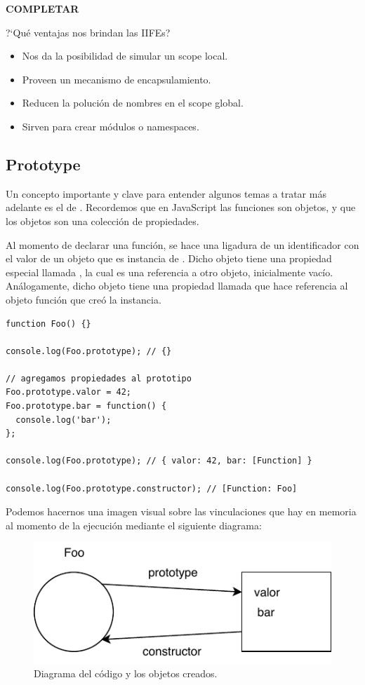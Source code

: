 \textbf{COMPLETAR}

?`Qué ventajas nos brindan las IIFEs?

\begin{itemize}
	\item Nos da la posibilidad de simular un scope local.
	\item Proveen un mecanismo de encapsulamiento.
	\item Reducen la polución de nombres en el scope global.
	\item Sirven para crear módulos o namespaces.
\end{itemize}

\subsection{Prototype}
\label{sec:prototype}

Un concepto importante y clave para entender algunos temas a tratar más adelante es el de . Recordemos que en JavaScript las funciones son objetos, y que los objetos son una colección de propiedades. 

Al momento de declarar una función, se hace una ligadura de un identificador con el valor de un objeto que es instancia de . Dicho objeto tiene una propiedad especial llamada , la cual es una referencia a otro objeto, inicialmente vacío. Análogamente, dicho objeto tiene una propiedad llamada  que hace referencia al objeto función que creó la instancia.

\begin{lstlisting}[title={Analizando el \code{prototype} de una función}]
function Foo() {}

console.log(Foo.prototype); // {}

// agregamos propiedades al prototipo
Foo.prototype.valor = 42;
Foo.prototype.bar = function() {
  console.log('bar');
};

console.log(Foo.prototype); // { valor: 42, bar: [Function] }

console.log(Foo.prototype.constructor); // [Function: Foo]

\end{lstlisting}

Podemos hacernos una imagen visual sobre las vinculaciones que hay en memoria al momento de la ejecución mediante el siguiente diagrama:

\begin{figure}[th]
\centering
\includegraphics{Figures/Prototype}
\decoRule
\caption[]{Diagrama del código y los objetos creados.}
\label{fig:prototype}
\end{figure}

